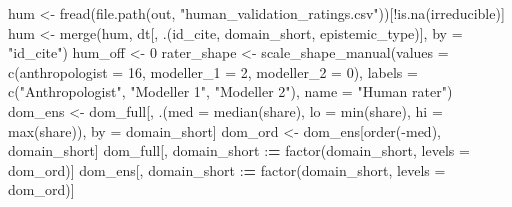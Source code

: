 \documentclass[
  11pt,
]{article}
\newenvironment{Shaded}{\begin{snugshade}}{\end{snugshade}}
\newcommand{\AttributeTok}[1]{\textcolor[rgb]{0.77,0.63,0.00}{#1}}
\newcommand{\DecValTok}[1]{\textcolor[rgb]{0.00,0.00,0.81}{#1}}
\newcommand{\ErrorTok}[1]{\textcolor[rgb]{0.64,0.00,0.00}{\textbf{#1}}}
\newcommand{\FunctionTok}[1]{\textcolor[rgb]{0.00,0.00,0.00}{#1}}
\newcommand{\NormalTok}[1]{#1}
\newcommand{\OtherTok}[1]{\textcolor[rgb]{0.56,0.35,0.01}{#1}}
\newcommand{\SpecialCharTok}[1]{\textcolor[rgb]{0.00,0.00,0.00}{#1}}
\newcommand{\StringTok}[1]{\textcolor[rgb]{0.31,0.60,0.02}{#1}}
\begin{document}
\begin{Shaded}
\begin{Highlighting}[]
\NormalTok{hum }\OtherTok{\textless{}{-}} \FunctionTok{fread}\NormalTok{(}\FunctionTok{file.path}\NormalTok{(out, }\StringTok{"human\_validation\_ratings.csv"}\NormalTok{))[}\SpecialCharTok{!}\FunctionTok{is.na}\NormalTok{(irreducible)]}
\NormalTok{hum }\OtherTok{\textless{}{-}} \FunctionTok{merge}\NormalTok{(hum, dt[, .(id\_cite, domain\_short, epistemic\_type)], }\AttributeTok{by =} \StringTok{"id\_cite"}\NormalTok{)}
\NormalTok{hum\_off }\OtherTok{\textless{}{-}} \DecValTok{0}
\NormalTok{rater\_shape }\OtherTok{\textless{}{-}} \FunctionTok{scale\_shape\_manual}\NormalTok{(}\AttributeTok{values =} \FunctionTok{c}\NormalTok{(}\AttributeTok{anthropologist =} \DecValTok{16}\NormalTok{, }\AttributeTok{modeller\_1 =} \DecValTok{2}\NormalTok{,}
                                             \AttributeTok{modeller\_2 =} \DecValTok{0}\NormalTok{),}
                                  \AttributeTok{labels =} \FunctionTok{c}\NormalTok{(}\StringTok{"Anthropologist"}\NormalTok{, }\StringTok{"Modeller 1"}\NormalTok{,}
                                             \StringTok{"Modeller 2"}\NormalTok{),}
                                  \AttributeTok{name =} \StringTok{"Human rater"}\NormalTok{)}
\NormalTok{dom\_ens }\OtherTok{\textless{}{-}}\NormalTok{ dom\_full[, .(}\AttributeTok{med =} \FunctionTok{median}\NormalTok{(share), }\AttributeTok{lo =} \FunctionTok{min}\NormalTok{(share), }\AttributeTok{hi =} \FunctionTok{max}\NormalTok{(share)),}
\NormalTok{                    by }\OtherTok{=}\NormalTok{ domain\_short]}
\NormalTok{dom\_ord }\OtherTok{\textless{}{-}}\NormalTok{ dom\_ens[}\FunctionTok{order}\NormalTok{(}\SpecialCharTok{{-}}\NormalTok{med), domain\_short]}
\NormalTok{dom\_full[, domain\_short }\SpecialCharTok{:}\ErrorTok{=} \FunctionTok{factor}\NormalTok{(domain\_short, }\AttributeTok{levels =}\NormalTok{ dom\_ord)]}
\NormalTok{dom\_ens[, domain\_short }\SpecialCharTok{:}\ErrorTok{=} \FunctionTok{factor}\NormalTok{(domain\_short, }\AttributeTok{levels =}\NormalTok{ dom\_ord)]}


\end{Highlighting}
\end{Shaded}
\end{document}
